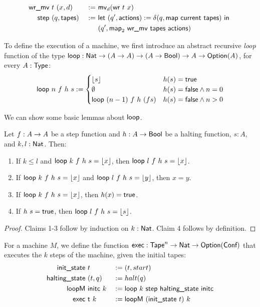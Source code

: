 \begin{definition}[Step]
  \label{def:step}
  \begin{alignat*}{2}
    \textsf{wr\_mv}&~t~(x, d)      &~:=~& \textsf{mv}_d (\textsf{wr}~t~x) \\
    \textsf{step}&~(q, \textsf{tapes}) &~:=~& \textsf{let}~(q', \textsf{actions}) := \delta(q, \textsf{map}~\textsf{current}~\textsf{tapes})~\textsf{in}~ \\
      &                        &~  ~& (q', \textsf{map}_2~\textsf{wr\_mv}~\textsf{tapes}~\textsf{actions})
  \end{alignat*}
\end{definition}

To define the execution of a machine, we first introduce an abstract recursive \emph{loop} function of the type
$\textsf{loop} : \textsf{Nat} \rightarrow (A \rightarrow A) \rightarrow (A \rightarrow \textsf{Bool}) \rightarrow A \rightarrow \textsf{Option}(A)$, for every $A:\textsf{Type}$:
\begin{align*}
  \textsf{loop}~n~f~h~s :=
  \begin{cases}
    \left\lfloor {s}\right\rfloor              & h(s) = \textsf{true} \\
    \emptyset                 & h(s) = \textsf{false} \land n = 0 \\
    \textsf{loop}~(n-1)~f~h~(f s)  & h(s) = \textsf{false} \land n > 0
  \end{cases}
\end{align*}

We can show some basic lemmas about $\textsf{loop}$.
\begin{lemma}
  \label{lem:loop}
  Let $f : A \rightarrow A$ be a step function and $h : A \rightarrow \textsf{Bool}$ be a halting function, $s:A$, and $k, l:\textsf{Nat}$.  Then:
  \begin{enumerate}
  \item If $k \le l$ and $\textsf{loop}~k~f~h~s = \left\lfloor {x}\right\rfloor$, then $\textsf{loop}~l~f~h~s = \left\lfloor {x}\right\rfloor$.
  \item If $\textsf{loop}~k~f~h~s = \left\lfloor {x}\right\rfloor$ and $\textsf{loop}~l~f~h~s = \left\lfloor {y}\right\rfloor$, then $x = y$.
  \item If $\textsf{loop}~k~f~h~s = \left\lfloor {x}\right\rfloor$, then $h(x) = \textsf{true}$.
  \item If $h~s = \textsf{true}$, then $\textsf{loop}~l~f~h~s = \left\lfloor {s}\right\rfloor$.
  \end{enumerate}
\end{lemma}
\begin{proof}
  Claims 1-3 follow by induction on $k:\textsf{Nat}$.  Claim 4 follows by definition.
\end{proof}

For a machine $M$, we define the function $\textsf{exec} : \textsf{Tape}^{n} \rightarrow \textsf{Nat} \rightarrow \textsf{Option}(\textsf{Conf})$ that executes the $k$ steps of the machine,
given the initial tapes:
\begin{alignat*}{3}
  \textsf{init\_state}   &~t               &&:= (t, start) \\
  \textsf{halting\_state}&~(t, q)          &&:= halt(q) \\
  \textsf{loopM}         &~\textsf{initc}~k    &&:= \textsf{loop}~k~\textsf{step}~\textsf{halting\_state}~\textsf{initc} \\
  \textsf{exec}          &~\textsf{t}~k        &&:= \textsf{loopM}~(\textsf{init\_state}~t)~k
\end{alignat*}

